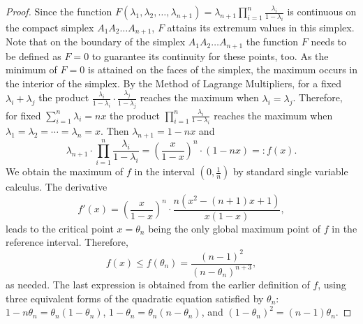 \documentclass[10pt,a4paper]{amsart}
\begin{document}
\begin{proof}
Since the function $F(\lambda_1,\lambda_2,\ldots,\lambda_{n+1})=\lambda_{n+1}\prod_{i=1}^n\frac{\lambda_i}{1-\lambda_i}$ is continuous on the compact simplex
$A_1A_2\ldots A_{n+1}$, $F$ attains its extremum values in this simplex. Note that on the boundary of the simplex
$A_1A_2\ldots A_{n+1}$ the function $F$ needs to be defined as $F = 0$ to guarantee its continuity for these points, too. As the
minimum of $F = 0$ is attained on the faces of the simplex, the maximum occurs in the interior of the simplex. By the Method of Lagrange Multipliers, for a fixed ${\lambda_i}+{\lambda_j}$ the product $\frac{\lambda_i}{1-\lambda_i}\cdot \frac{\lambda_j}{1-\lambda_j}$ reaches the maximum when $\lambda_i={\lambda_j}$. Therefore, for fixed $\sum_{i=1}^n{\lambda_i}=nx$ the product $\prod_{i=1}^n\frac{\lambda_i}{1-\lambda_i}$ reaches the maximum when $\lambda_1={\lambda_2}=\cdots=\lambda_n=x$. Then $\lambda_{n+1}=1-nx$ and $$\lambda_{n+1}\cdot\prod_{i=1}^n\frac{\lambda_i}{1-\lambda_i}=\left(\frac{x}{1-x}\right)^{n}\cdot \left(1-nx\right)=:f(x).$$
We obtain the maximum of $f$ in the interval $\left(0,\frac{1}{n}\right)$ by standard single variable calculus. The derivative $$f'(x)=\left(\frac{x}{1-x}\right)^{n} \cdot\frac{n \left(x^{2}-(n+1)x+1\right)}{x \left(1-x\right)},$$leads
to the critical point $x=\theta_n$ being the only global maximum point of $f$
in the reference interval. Therefore, $$f(x)\le f \left(\theta_n\right)=\frac{(n-1)^2}{(n-\theta_n)^{n+3}},$$
as needed. The last expression is obtained from the earlier definition
of $f$, using three equivalent forms of the quadratic equation satisfied by $\theta_n$: $1-n\theta_n=\theta_n(1-\theta_n)$, $1-\theta_n=\theta_n(n-\theta_n)$, and $(1-\theta_n)^2=(n-1)\theta_n$.
\end{proof}
\end{document}
